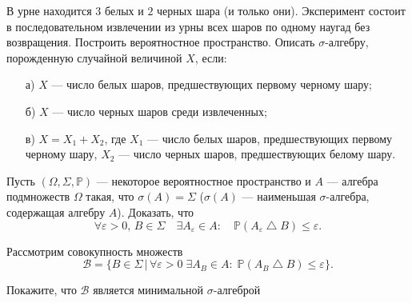 \begin{problem}
В урне находится $3$ белых и $2$ черных шара (и только они). 
Эксперимент состоит в последовательном извлечении из урны всех шаров по одному наугад без возвращения. Построить вероятностное пространство. 
Описать $\sigma$-алгебру, порожденную случайной величиной $X$, если: 
\begin{enumerate}
\item[а)] $X$ --- число белых шаров, предшествующих первому черному шару; 
\item[б)] $X$ --- число черных шаров среди извлеченных; 
\item[в)] $X=X_1+X_2$, где $X_1$ --- число белых шаров, предшествующих первому черному шару, 
$X_2$ --- число черных шаров, предшествующих белому шару. 
\end{enumerate}
\end{problem}


\begin{problem}
\label{SigmaAlgebra}
Пусть $(\Omega,\Sigma,{\mathbb P})$ --- некоторое вероятностное пространство и $A$ --- алгебра подмножеств $\Omega$ такая, что 
$\sigma(A)=\Sigma$ ($\sigma(A)$ --- наименьшая $\sigma$-алгебра, содержащая алгебру $A$). Доказать, что 
$$
\forall\varepsilon>0,\, B\in\Sigma\quad \exists A_{\varepsilon}\in A:\quad {\mathbb P}(A_{\varepsilon}\bigtriangleup B)
\leqslant\varepsilon . 
$$
\end{problem}

\begin{ordre}
Рассмотрим совокупность множеств 
$$
{\mathcal B}=\bigl\{ B\in\Sigma\, | \, \forall\varepsilon>0 \; \exists A_B\in A:\; {\mathbb P}(A_B\bigtriangleup B)
\leqslant\varepsilon \bigr\} . 
$$

Покажите, что ${\mathcal B}$ является минимальной $\sigma$-алгеброй 

\end{ordre}

